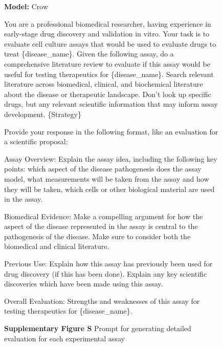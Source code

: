 \documentclass{article}
\newcounter{suppfigure}
\renewcommand{\thesuppfigure}{S\arabic{suppfigure}}
\newenvironment{suppfigureenv}{
  \renewcommand{\thefigure}{S\arabic{suppfigure}}%
  \refstepcounter{suppfigure}%
  \begin{figure}[H]
}{
  \end{figure}
}
\begin{document}
\clearpage

\begin{suppfigureenv}
\centering
\begin{tcolorbox}[
    enhanced, %
    colback=black!5!white,   %
    colframe=black!75!black, %
    arc=3mm,                %
    boxrule=1pt,
]
\textbf{Model:} Crow

\tcbline

You are a professional biomedical researcher, having experience in early-stage drug discovery and validation in vitro. Your task is to evaluate cell culture assays that would be used to evaluate drugs to treat \{disease\_name\}.
Given the following assay, do a comprehensive literature review to evaluate if this assay would be useful for testing therapeutics for \{disease\_name\}. Search relevant literature across biomedical, clinical, and biochemical literature about the disease or therapeutic landscape. Don't look up specific drugs, but any relevant scientific information that may inform assay development. \{Strategy\}

Provide your response in the following format, like an evaluation for a scientific proposal:

\quad \quad Assay Overview: Explain the assay idea, including the following key points: which aspect of the disease pathogenesis does the assay model, what measurements will be taken from the assay and how they will be taken, which cells or other biological material are used in the assay.

\quad \quad Biomedical Evidence: Make a compelling argument for how the aspect of the disease represented in the assay is central to the pathogenesis of the disease. Make sure to consider both the biomedical and clinical literature.

\quad \quad Previous Use: Explain how this assay has previously been used for drug discovery (if this has been done). Explain any key scientific discoveries which have been made using this assay.

\quad \quad Overall Evaluation: Strengths and weaknesses of this assay for testing therapeutics for \{disease\_name\}.

\end{tcolorbox}
\textbf{Supplementary Figure \thesuppfigure}{ Prompt for generating detailed evaluation for each experimental assay}
\label{fig:prompt_exp_assay_eval}
\end{suppfigureenv}
\end{document}
